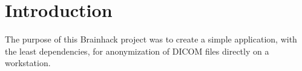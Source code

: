 \documentclass[twocolumn]{bmcart}%
\begin{document}
\begin{frontmatter}
\begin{fmbox}



	








%
\end{fmbox}%

\end{frontmatter}


\section{Introduction}\label{introduction}

The purpose of this Brainhack project was to create a simple
application, with the least dependencies, for anonymization of DICOM
files directly on a workstation.
\end{document}
